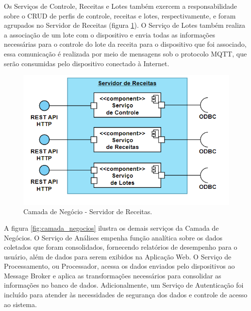 Os Serviços de Controle, Receitas e Lotes também exercem a responsabilidade sobre o CRUD de perfis de controle, receitas e lotes, respectivamente, e foram agrupados no Servidor de Receitas (figura \ref{fig:camada_negocios_receita}). O Serviço de Lotes também realiza a associação de um lote com o dispositivo e envia todas as informações necessárias para o controle do lote da receita para o dispositivo que foi associado, essa comunicação é realizada por meio de mensagens sob o protocolo MQTT, que serão consumidas pelo dispositivo conectado à Internet.

\begin{figure}[h]
    \centering
    \includegraphics[scale=0.50]{figuras/projeto/software/camada_negocios_receita.PNG}
    \caption{Camada de Negócio - Servidor de Receitas.}
    \label{fig:camada_negocios_receita}
\end{figure}

A figura \ref{fig:camada_negocios} ilustra os demais serviços da Camada de Negócios. O Serviço de Análises empenha função analítica sobre os dados coletados que foram consolidados, fornecendo relatórios de desempenho para o usuário, além de dados para serem exibidos na Aplicação Web. O Serviço de Processamento, ou Processador, acessa os dados enviados pelo dispositivos ao Message Broker e aplica as transformações necessários para consolidar as informações no banco de dados. Adicionalmente, um Serviço de Autenticação foi incluído para atender às necessidades de segurança dos dados e controle de acesso ao sistema.
    

